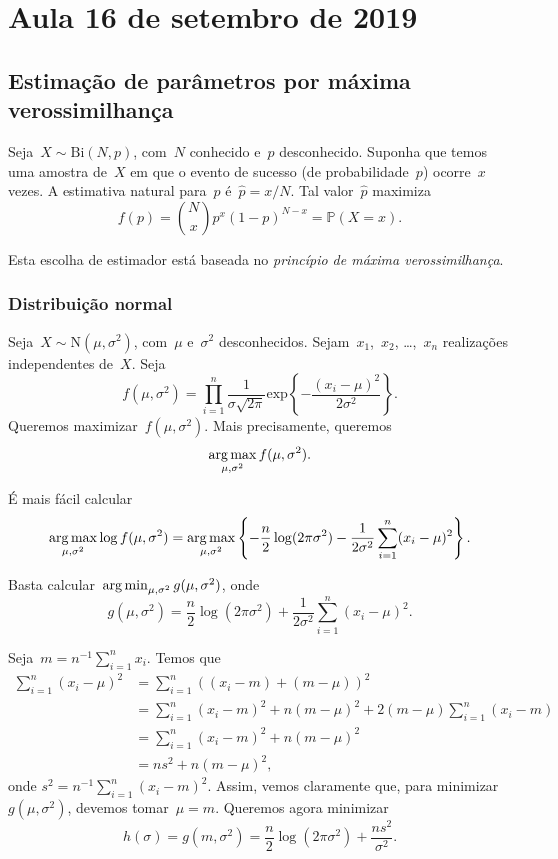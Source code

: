 \section{Aula 16 de setembro de 2019}
\label{2019_09_16}

\subsection{Estimação de parâmetros por máxima verossimilhança}

Seja~$X \sim \mathrm{Bi}(N,p)$, com~$N$ conhecido
 e~$p$ desconhecido. Suponha que temos uma amostra de~$X$ em que o 
 evento de sucesso (de probabilidade~$p$) ocorre~$x$ vezes.
 A estimativa natural para~$p$ é~$\hat{p} = x / N$.
 Tal valor~$\hat{p}$ maximiza
 $$f(p)={N \choose x}p^x(1-p)^{N-x} = \mathbb{P}(X=x).$$
 
 Esta escolha de estimador está baseada no
 \emph{princípio de máxima verossimilhança}.
 
 \subsubsection{Distribuição normal}
  Seja~$X \sim \mathrm{N}(\mu, \sigma^2)$, com~$\mu$ e~$\sigma^2$
  desconhecidos. Sejam~$x_1$,~$x_2$, \dots,~$x_n$ realizações
  independentes de~$X$. Seja
  $$f(\mu, \sigma^2)
  = \prod_{i=1}^{n} \frac{1}{\sigma\sqrt{2\pi}}
  \mathrm{exp}\left\{ -\frac{(x_i-\mu)^2}{2\sigma^2} \right\}.$$
  Queremos maximizar~$f(\mu, \sigma^2)$. Mais precisamente, queremos
  $$\operatorname*{arg\,max}_{\mu, \sigma^2}{f(\mu, \sigma^2)}.$$
  
  É mais fácil calcular
  $$\operatorname*{arg\,max}_{\mu, \sigma^2}{\log{f(\mu, \sigma^2)}}
  =\operatorname*{arg\,max}_{\mu, \sigma^2}\left\{ -\frac{n}{2}\log(2\pi\sigma^2)
  -\frac{1}{2\sigma^2}\sum_{i=1}^{n}(x_i-\mu)^2 \right\}.$$
  
  Basta calcular~$\operatorname*{arg\,min}_{\mu, \sigma^2}{g(\mu, \sigma^2)}$, onde
  $$g(\mu, \sigma^2)
  = \frac{n}{2}\log(2\pi\sigma^2)
   + \frac{1}{2\sigma^2}\sum_{i=1}^{n}(x_i-\mu)^2.$$
   
  Seja~$m=n^{-1}\sum_{i=1}^{n}{x_i}$. Temos que
  $$\begin{aligned} \sum_{i=1}^{n}(x_i-\mu)^2
  &=\sum_{i=1}^{n}((x_i-m)+(m-\mu))^2 \\
  &=\sum_{i=1}^{n}(x_i-m)^2 + n(m-\mu)^2
    + 2(m-\mu)\sum_{i=1}^{n}(x_i-m) \\
  &= \sum_{i=1}^{n}(x_i-m)^2 + n(m-\mu)^2 \\
  &= ns^2 + n(m-\mu)^2,
  \end{aligned}$$
  onde $s^2=n^{-1}\sum_{i=1}^{n}(x_i-m)^2$.
  Assim, vemos claramente que, para minimizar~$g(\mu, \sigma^2)$,
  devemos tomar~$\mu=m$. Queremos agora minimizar
  $$h(\sigma)=g(m,\sigma^2)=\frac{n}{2}\log(2\pi\sigma^2)
   + \frac{ns^2}{\sigma^2}.$$
   

